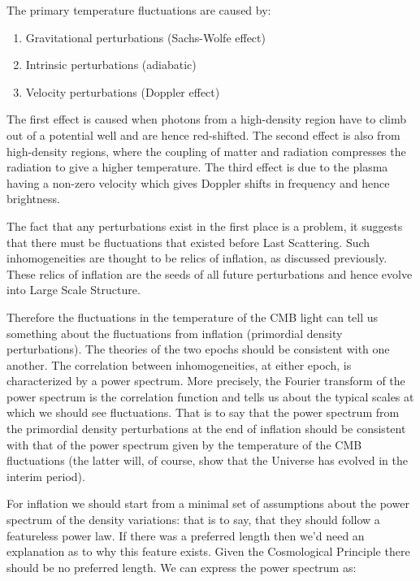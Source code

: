 The primary temperature fluctuations are caused by:

\begin{enumerate}
\item Gravitational perturbations (Sachs-Wolfe effect) 
\item Intrinsic perturbations (adiabatic)
\item Velocity perturbations (Doppler effect)
\end{enumerate}

The first effect is caused when photons from a high-density region have to climb out of a potential well and are hence red-shifted. The second effect is also from high-density regions, where the coupling of matter and radiation compresses the radiation to give a higher temperature. The third effect is due to the plasma having a non-zero velocity which gives Doppler shifts in frequency and hence brightness.

The fact that any perturbations exist in the first place is a problem, it suggests that there must be fluctuations that existed before Last Scattering. Such inhomogeneities are thought to be relics of inflation, as discussed previously. These relics of inflation are the seeds of all future perturbations and hence evolve into Large Scale Structure.

Therefore the fluctuations in the temperature of the CMB light can tell us something about the fluctuations from inflation (primordial density perturbations). The theories of the two epochs should be consistent with one another. The correlation between inhomogeneities, at either epoch, is characterized by a power spectrum. More precisely, the Fourier transform of the power spectrum is the correlation function and tells us about the typical scales at which we should see fluctuations. That is to say that the power spectrum from the primordial density perturbations at the end of inflation should be consistent with that of the power spectrum given by the temperature of the CMB fluctuations (the latter will, of course, show that the Universe has evolved in the interim period).

For inflation we should start from a minimal set of assumptions about the power spectrum of the density variations: that is to say, that they should follow a featureless power law. If there was a preferred length then we'd need an explanation as to why this feature exists. Given the Cosmological Principle there should be no preferred length. We can express the power spectrum as:

